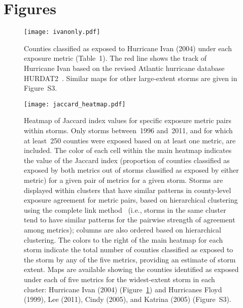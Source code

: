 \section*{Figures}

\listoffigures

\clearpage

\begin{figure}%
\centering
\texttt{[image: ivanonly.pdf]}
\caption{Counties classified as exposed to Hurricane Ivan (2004) under each
exposure metric (Table~1). The red line shows the track of Hurricane Ivan 
based on the revised Atlantic hurricane database \ac{HURDAT2}~\parencite{landsea2013}.
Similar maps for other large-extent storms are given in Figure~S3.}
\label{fig:ivanexposure} 
\end{figure}

\clearpage

\begin{figure}%
\centering 
\texttt{[image: jaccard\_heatmap.pdf]} 
\caption{Heatmap of Jaccard index values for specific exposure metric pairs
within storms. Only storms between~1996 and~2011, and for which at least~250
counties were exposed based on at least one metric, are included. The color of
each cell within the main heatmap indicates the value of the Jaccard index
(proportion of counties classified as exposed by both metrics out of storms
classified as exposed by either metric) for a given pair of metrics for a given
storm. Storms are displayed within clusters that have similar patterns in
county-level exposure agreement for metric pairs, based on hierarchical
clustering using the complete link method~\parencite{murtagh2012algorithms} (i.e.,
storms in the same cluster tend to have similar patterns for the pairwise
strength of agreement among metrics); columns are also ordered based on
hierarchical clustering. The colors to the right of the main heatmap for each
storm indicate the total number of counties classified as exposed to the storm
by any of the five metrics, providing an estimate of storm extent. Maps are
available showing the counties identified as exposed under each of five metrics
for the widest-extent storm in each cluster: Hurricane Ivan (2004)
(Figure~\ref{fig:ivanexposure}) and Hurricanes Floyd (1999), Lee (2011), Cindy
(2005), and Katrina (2005) (Figure~S3).} 
\label{fig:jaccard}
\end{figure}

\clearpage

